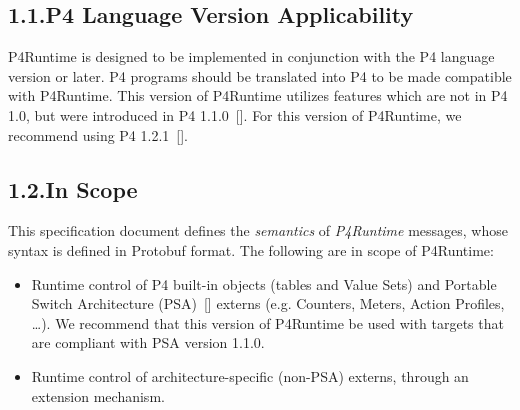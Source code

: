 \documentclass[11pt]{article}
\begin{document}
{%
\subsection{1.1.\hspace*{0.5em}P4 Language Version Applicability}\label{sec-p4-language-version-applicability}%

\noindent{}P4Runtime is designed to be implemented in conjunction with the P4 language
version or later. P4 programs should be translated into P4 to be made
compatible with P4Runtime. This version of P4Runtime utilizes features which are
not in P4 1.0, but were introduced in P4 1.1.0~[]. For
this version of P4Runtime, we recommend using P4 1.2.1~[].%

\subsection{1.2.\hspace*{0.5em}In Scope}\label{sec-in-scope}%

\noindent{}This specification document defines the \emph{semantics} of \emph{P4Runtime} messages,
whose syntax is defined in Protobuf format. The following are in scope of
P4Runtime:%

\begin{itemize}[noitemsep,topsep=\mdcompacttopsep]%

\item{}Runtime control of P4 built-in objects (tables and Value Sets) and Portable
Switch Architecture (PSA)~[] externs (e.g. Counters, Meters, Action
Profiles, \dots{}). We recommend that this version of P4Runtime be used with
targets that are compliant with PSA version 1.1.0.%

\item{}Runtime control of architecture-specific (non-PSA) externs, through an
extension mechanism.%


\end{itemize}}
\end{document}
